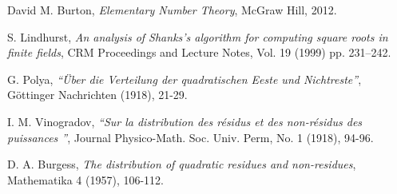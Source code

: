 \documentclass{article}
\begin{document}
\begin{thebibliography}{9}

David M. Burton, \textit{Elementary Number Theory},
McGraw Hill, 2012.

S. Lindhurst, \textit{An analysis of Shanks's algorithm for computing square roots in finite fields},
CRM Proceedings and Lecture Notes, Vol. 19 (1999) pp. 231–242.

G. Polya,
\textit{``{\"U}ber die Verteilung der quadratischen Eeste und Nichtreste''},
G{\"o}ttinger Nachrichten (1918), 21-29.
 
I. M. Vinogradov,
\textit{``Sur la distribution des r{\'e}sidus et des non-r{\'e}sidus des puissances ''},
Journal Physico-Math. Soc. Univ. Perm, No. 1 (1918), 94-96.
 
 D. A. Burgess,
\textit{The distribution of quadratic residues and non-residues},
Mathematika 4 (1957), 106-112.

\end{thebibliography}
\end{document}

